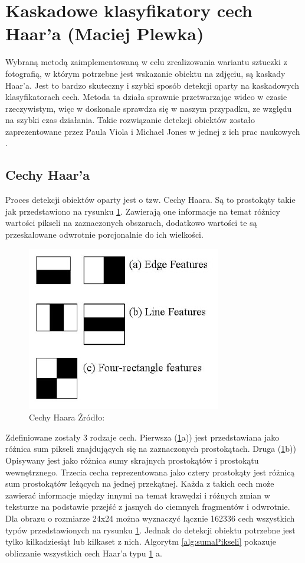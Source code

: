 \section{Kaskadowe klasyfikatory cech Haar'a (Maciej Plewka)}

Wybraną metodą zaimplementowaną w celu zrealizowania wariantu sztuczki z fotografią, w którym potrzebne jest wskazanie obiektu na zdjęciu, są kaskady Haar'a. Jest to bardzo skuteczny i szybki sposób detekcji oparty na kaskadowych klasyfikatorach cech. Metoda ta działa sprawnie przetwarzając wideo w czasie rzeczywistym, więc w doskonale sprawdza się w naszym przypadku, ze względu na szybki czas działania. Takie rozwiązanie detekcji obiektów zostało zaprezentowane przez Paula Viola i Michael Jones w jednej z ich prac naukowych \cite{violaJones}.

\subsection{Cechy Haar'a}
Proces detekcji obiektów oparty jest o tzw. Cechy Haara. Są to prostokąty takie jak przedstawiono na rysunku \ref{fig:cechyHaara}. Zawierają one informacje na temat różnicy wartości pikseli na zaznaczonych obszarach, dodatkowo wartości te są przeskalowane odwrotnie porcjonalnie do ich wielkości.
\begin{figure}[H]
	\centering
	\includegraphics[scale=0.5]{imgs/cechy.jpg}
	\caption{{Cechy Haara Źródło:} \cite{faceDetectionOpenCV}}
	\label{fig:cechyHaara}
\end{figure}

Zdefiniowane zostały 3 rodzaje cech. Pierwsza (\ref{fig:cechyHaara}a)) jest przedstawiana jako różnica sum pikseli znajdujących się na zaznaczonych prostokątach. Druga (\ref{fig:cechyHaara}b))  Opisywany jest jako różnica sumy skrajnych prostokątów i prostokątu wewnętrznego. Trzecia cecha reprezentowana jako cztery prostokąty jest różnicą sum prostokątów leżących na jednej przekątnej. Każda z takich cech może zawierać informacje między innymi na temat krawędzi i różnych zmian w teksturze na podstawie przejść z jasnych do ciemnych fragmentów i odwrotnie. Dla obrazu o rozmiarze 24x24 można wyznaczyć łącznie 162336 cech wszystkich typów przedstawionych na rysunku \ref{fig:cechyHaara}. Jednak do detekcji obiektu potrzebne jest tylko kilkadziesiąt lub kilkaset z nich. Algorytm \ref{alg:sumaPikseli} pokazuje obliczanie wszystkich cech Haar'a typu \ref{fig:cechyHaara} a.


